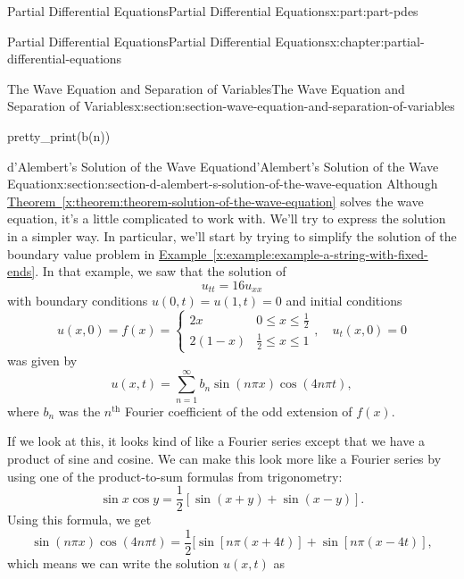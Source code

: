 \documentclass[twoside,10pt,]{book}
\newcommand{\xreffont}{\relax}
\numberwithin{equation}{part}
\renewcommand{\th}{\text{th}}
\newcommand{\amp}{&}
\begin{document}
\begin{partptx}{Partial Differential Equations}{}{Partial Differential Equations}{}{}{x:part:part-pdes}
\begin{chapterptx}{Partial Differential Equations}{}{Partial Differential Equations}{}{}{x:chapter:partial-differential-equations}
\begin{sectionptx}{The Wave Equation and Separation of Variables}{}{The Wave Equation and Separation of Variables}{}{}{x:section:section-wave-equation-and-separation-of-variables}
\begin{sageinput}
pretty_print(b(n))
\end{sageinput}
\end{sectionptx}
%
%
\typeout{************************************************}
\typeout{************************************************}
%
\begin{sectionptx}{d'Alembert's Solution of the Wave Equation}{}{d'Alembert's Solution of the Wave Equation}{}{}{x:section:section-d-alembert-s-solution-of-the-wave-equation}
Although \hyperref[x:theorem:theorem-solution-of-the-wave-equation]{Theorem~{\xreffont\ref{x:theorem:theorem-solution-of-the-wave-equation}}} solves the wave equation, it's a little complicated to work with. We'll try to express the solution in a simpler way. In particular, we'll start by trying to simplify the solution of the boundary value problem in \hyperref[x:example:example-a-string-with-fixed-ends]{Example~{\xreffont\ref{x:example:example-a-string-with-fixed-ends}}}. In that example, we saw that the solution of%
\begin{equation*}
u_{tt} = 16u_{xx}
\end{equation*}
with boundary conditions \(u(0,t) = u(1,t) = 0\) and initial conditions%
\begin{equation*}
u(x,0) = f(x) = \begin{cases} 2x \amp 0\leq x\leq \frac{1}{2} \\ 2(1-x) \amp \frac{1}{2}\leq x\leq 1 \end{cases},\quad u_{t}(x,0) = 0
\end{equation*}
was given by%
\begin{equation*}
u(x,t) = \sum_{n=1}^{\infty}b_{n}\sin(n\pi x)\cos(4n\pi t),
\end{equation*}
where \(b_{n}\) was the \(n^{\th}\) Fourier coefficient of the odd extension of \(f(x)\).%
\par
If we look at this, it looks kind of like a Fourier series except that we have a product of sine and cosine. We can make this look more like a Fourier series by using one of the product-to-sum formulas from trigonometry:%
%
\begin{equation*}
\sin x\cos y = \frac{1}{2}[\sin(x+y)+\sin(x-y)].
\end{equation*}
Using this formula, we get%
\begin{equation*}
\sin(n\pi x)\cos(4n\pi t) = \frac{1}{2}[\sin[n\pi(x+4t)]+\sin[n\pi(x-4t)],
\end{equation*}
which means we can write the solution \(u(x,t)\) as%

\end{sectionptx}
\end{chapterptx}
\end{partptx}
\end{document}
